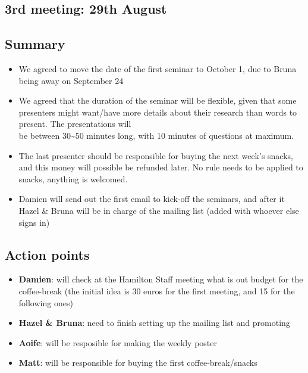 \documentclass[]{article}
\providecommand{\tightlist}{%
  \setlength{\itemsep}{0pt}\setlength{\parskip}{0pt}}
\begin{document}
\hypertarget{rd-meeting-29th-august}{%
\subsection{3rd meeting: 29th August}\label{rd-meeting-29th-august}}

\hypertarget{summary-2}{%
\subsection{Summary}\label{summary-2}}

\begin{itemize}
\tightlist
\item
  We agreed to move the date of the first seminar to October 1, due to
  Bruna being away on September 24
\item
  We agreed that the duration of the seminar will be flexible, given
  that some presenters might want/have more details about their research
  than words to present. The presentations will\\
  be between 30\textasciitilde{}50 minutes long, with 10 minutes of
  questions at maximum.
\item
  The last presenter should be responsible for buying the next week's
  snacks, and this money will possible be refunded later. No rule needs
  to be applied to snacks, anything is welcomed.
\item
  Damien will send out the first email to kick-off the seminars, and
  after it Hazel \& Bruna will be in charge of the mailing list (added
  with whoever else signs in)
\end{itemize}

\hypertarget{action-points-2}{%
\subsection{Action points}\label{action-points-2}}

\begin{itemize}
\tightlist
\item
  \textbf{Damien}: will check at the Hamilton Staff meeting what is out
  budget for the coffee-break (the initial idea is 30 euros for the
  first meeting, and 15 for the following ones)
\item
  \textbf{Hazel \& Bruna}: need to finish setting up the mailing list
  and promoting
\item
  \textbf{Aoife}: will be resposible for making the weekly poster
\item
  \textbf{Matt}: will be responsible for buying the first
  coffee-break/snacks
\end{itemize}
\end{document}
